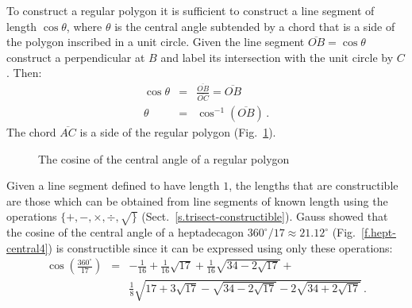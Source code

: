 To construct a regular polygon it is sufficient to construct a line segment of length $\cos \theta$, where $\theta$ is the central angle subtended by a chord that is a side of the polygon inscribed in a unit circle. Given the line segment $\overline{OB}=\cos\theta$ construct a perpendicular at $B$ and label its intersection with the unit circle by $C$. Then:
\begin{eqnarray*}
\cos \theta&=&\displaystyle\frac{\overline{OB}}{\overline{OC}}=\overline{OB}\\
\theta &=& \cos^{-1} (\overline{OB})\,.
\end{eqnarray*}
The chord $\overline{AC}$ is a side of the regular polygon (Fig.~\ref{f.hept-central1}).
\begin{figure}[b]
\begin{center}
\end{center}
\caption{The cosine of the central angle of a regular polygon}\label{f.hept-central1}
\end{figure}

Given a line segment defined to have length $1$, the lengths that are constructible are those which can be obtained from line segments of known length using the operations $\{+,-,\times,\div,\surd\}$ (Sect.~\ref{s.trisect-constructible}). Gauss showed that the cosine of the central angle of a heptadecagon $360^\circ/17\approx 21.12^\circ$ (Fig.~\ref{f.hept-central4}) is constructible since it can be expressed using only these operations:
\begin{eqnarray*}
\cos\left(\frac{360^\circ}{17}\right) &=& 
-\frac{1}{16}+\frac{1}{16}\sqrt{17} + 
     \frac{1}{16}\sqrt{34-2\sqrt{17}}
    + \\
    &&
     \frac{1}{8}\sqrt{
     17+3\sqrt{17} - 
     \sqrt{34-2\sqrt{17}}
   -2
     \sqrt{34+2\sqrt{17}}
   }\,.
\end{eqnarray*}

